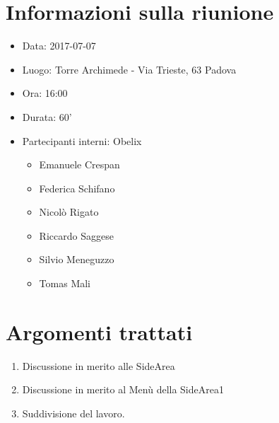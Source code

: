 \documentclass[10 pt,a4paper, openany]{article}
\date{}
\begin{document}
\paginatitolo
\section{Informazioni sulla riunione}

\begin{itemize}
\item[] Data: 2017-07-07
\item[] Luogo: Torre Archimede - Via Trieste, 63 Padova
\item[] Ora: 16:00
\item[] Durata: 60'
\item[] Partecipanti interni: Obelix
  \begin{itemize}
  \item[] Emanuele Crespan
  \item[] Federica Schifano
  \item[] Nicolò Rigato
  \item[] Riccardo Saggese
  \item[] Silvio Meneguzzo
  \item[] Tomas Mali
 \end{itemize}
\end{itemize}

\section{Argomenti trattati}
\begin{enumerate}
	\item Discussione in merito alle SideArea
	\item Discussione in merito al Menù della SideArea1
	\item Suddivisione del lavoro.
\end{enumerate}
\end{document}
